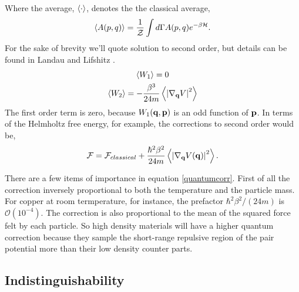 %
Where the average, $\left\langle \cdot \right\rangle$, denotes the the classical average, 
%
\begin{equation} \langle A(p, q) \rangle = \frac{1}{\mathcal{Z}} \int d\Gamma A(p, q)
e^{-\beta \mathcal{H}}.  \end{equation}
%
For the sake of brevity we'll quote solution to second order, but
details can be found in Landau and Lifshitz \cite{LANDAU198079}.
%
\begin{gather}
    \left\langle W_1 \right\rangle= 0 \\
    \left\langle W_2 \right\rangle = - \frac{\beta^3}{24 m} \left\langle \left\vert\nabla_{\mathbf{q}} V \right\vert^2 \right\rangle
\end{gather}
%
The first order term is zero, because $W_1(\mathbf{q}, \mathbf{p})$ is an odd function of $\mathbf{p}$.
In terms of the Helmholtz free energy, for example, the corrections to second
order would be, 
%
\begin{equation}
    \label{quantumcorr}
    \mathcal{F} = \mathcal{F}_{classical} + \frac{\hbar^2\beta^2}{24m}
        \left\langle  \left\vert \nabla_{\mathbf{q}} V(\mathbf{q}) \right\vert^2  \right\rangle.
\end{equation}

There are a few items of importance in equation \ref{quantumcorr}. First of all
the correction inversely proportional to both the temperature and the particle
mass.  For copper at room termperature, for instance, the prefactor
$\hbar^2\beta^2/(24 m)$ is $\mathcal{O}(10^{-4})$.  The correction is also
proportional to the mean of the squared force felt by each particle. So high
density materials will have a higher quantum correction because they sample the
short-range repulsive region of the pair potential more than their low density
counter parts.

\subsection{Indistinguishability} %

